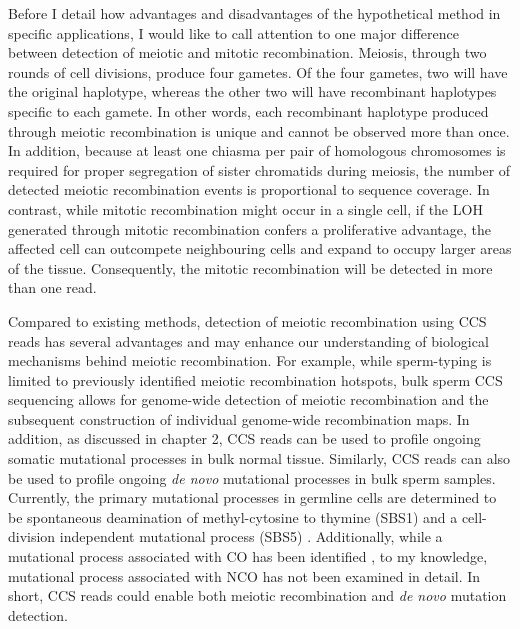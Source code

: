 Before I detail how advantages and disadvantages of the hypothetical method in specific applications, I would like to call attention to one major difference between detection of meiotic and mitotic recombination. Meiosis, through two rounds of cell divisions, produce four gametes. Of the four gametes, two will have the original haplotype, whereas the other two will have recombinant haplotypes specific to each gamete. In other words, each recombinant haplotype produced through meiotic recombination is unique and cannot be observed more than once. In addition, because at least one chiasma per pair of homologous chromosomes is required for proper segregation of sister chromatids during meiosis, the number of detected meiotic recombination events is proportional to sequence coverage. In contrast, while mitotic recombination might occur in a single cell, if the LOH generated through mitotic recombination confers a proliferative advantage, the affected cell can outcompete neighbouring cells and expand to occupy larger areas of the tissue. Consequently, the mitotic recombination will be detected in more than one read.

Compared to existing methods, detection of meiotic recombination using CCS reads has several advantages and may enhance our understanding of biological mechanisms behind meiotic recombination. For example, while sperm-typing is limited to previously identified meiotic recombination hotspots, bulk sperm CCS sequencing allows for genome-wide detection of meiotic recombination and the subsequent construction of individual genome-wide recombination maps. In addition, as discussed in chapter 2, CCS reads can be used to profile ongoing somatic mutational processes in bulk normal tissue. Similarly, CCS reads can also be used to profile ongoing \textit{de novo} mutational processes in bulk sperm samples. Currently, the primary mutational processes in germline cells are determined to be spontaneous deamination of methyl-cytosine to thymine (SBS1) and a cell-division independent mutational process (SBS5) \cite{}.  Additionally, while a mutational process associated with CO has been identified \cite{}, to my knowledge, mutational process associated with NCO has not been examined in detail. In short, CCS reads could enable both meiotic recombination and \textit{de novo} mutation detection. 

